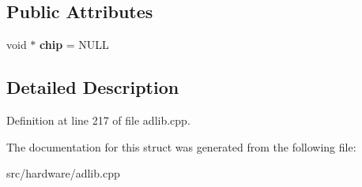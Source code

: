 \subsection*{Public Attributes}
\begin{DoxyCompactItemize}
\item 
\hypertarget{structMAMEOPL2_1_1Handler_aaeb8b2c151dadaf5968466398c0baacb}{void $\ast$ {\bfseries chip} = N\-U\-L\-L}\label{structMAMEOPL2_1_1Handler_aaeb8b2c151dadaf5968466398c0baacb}

\end{DoxyCompactItemize}


\subsection{Detailed Description}


Definition at line 217 of file adlib.\-cpp.



The documentation for this struct was generated from the following file\-:\begin{DoxyCompactItemize}
\item 
src/hardware/adlib.\-cpp\end{DoxyCompactItemize}
